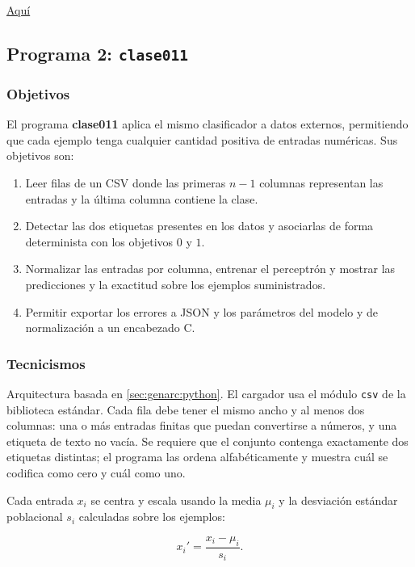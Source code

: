 \documentclass{article}[12pt,a4paper]
\begin{document}
\href{https://github.com/MarcosHCK/master-programming/tree/master/clase010}{Aquí \faGithubSquare}

\subsection{Programa 2: \texttt{clase011}}

\subsubsection{Objetivos}

El programa \textbf{clase011} aplica el mismo clasificador a datos externos,
permitiendo que cada ejemplo tenga cualquier cantidad positiva de entradas
numéricas. Sus objetivos son:

\begin{enumerate}
  \item Leer filas de un CSV donde las primeras \(n-1\) columnas representan
    las entradas y la última columna contiene la clase.
  \item Detectar las dos etiquetas presentes en los datos y asociarlas de forma
    determinista con los objetivos \(0\) y \(1\).
  \item Normalizar las entradas por columna, entrenar el perceptrón y mostrar
    las predicciones y la exactitud sobre los ejemplos suministrados.
  \item Permitir exportar los errores a JSON y los parámetros del modelo y de
    normalización a un encabezado C.
\end{enumerate}

\subsubsection{Tecnicismos}

Arquitectura basada en \ref{sec:genarc:python}. El cargador usa el módulo
\texttt{csv} de la biblioteca estándar. Cada fila debe tener el
mismo ancho y al menos dos columnas: una o más entradas finitas que puedan
convertirse a números, y una etiqueta de texto no vacía. Se requiere que el
conjunto contenga exactamente dos etiquetas distintas; el programa las ordena
alfabéticamente y muestra cuál se codifica como cero y cuál como uno.

Cada entrada \(x_i\) se centra y escala usando la media \(\mu_i\) y la
desviación estándar poblacional \(s_i\) calculadas sobre los ejemplos:

\[
  x_i' = \frac{x_i - \mu_i}{s_i}.
\]
\end{document}
